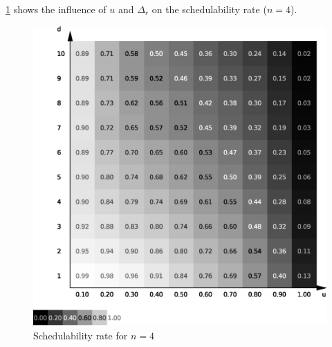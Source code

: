 \ref{fig:stu:4s} shows the influence of $u$ and $\Delta_r$ on the schedulability rate ($n = 4$).

\begin{figure}
	\centering
	\includegraphics[width=1\textwidth]{../mean/eps/4s}
	\caption{\label{fig:stu:4s} Schedulability rate for $n = 4$}
\end{figure}
